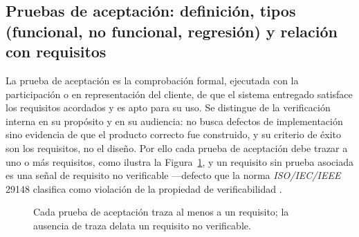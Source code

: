 \documentclass[11pt,a4paper,oneside]{report}
\begin{document}
	\subsection{Pruebas de aceptaci\'on: definici\'on, tipos (funcional, no funcional, regresi\'on) y relaci\'on con requisitos}
	
	La prueba de aceptaci\'on es la comprobaci\'on formal, ejecutada con la participaci\'on o en representaci\'on del cliente, de que el sistema entregado satisface los requisitos acordados y es apto para su uso. Se distingue de la verificaci\'on interna en su prop\'osito y en su audiencia: no busca defectos de implementaci\'on sino evidencia de que el producto correcto fue construido, y su criterio de \'exito son los requisitos, no el dise\~no. Por ello cada prueba de aceptaci\'on debe trazar a uno o m\'as requisitos, como ilustra la Figura~\ref{fig:aceptacion}, y un requisito sin prueba asociada es una se\~nal de requisito no verificable ---defecto que la norma \textit{ISO/IEC/IEEE} 29148 clasifica como violaci\'on de la propiedad de verificabilidad \citep{iso29148_2018}.
	
	\begin{figure}[htbp]
		\centering
		\caption{Cada prueba de aceptaci\'on traza al menos a un requisito; la ausencia de traza delata un requisito no verificable.}
		\label{fig:aceptacion}
	\end{figure}
	
\end{document}
